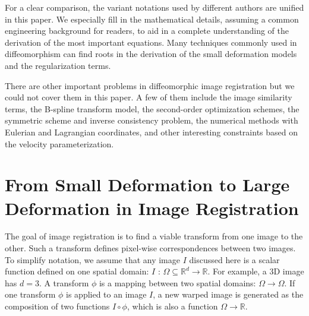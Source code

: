 \documentclass[letterpaper,12pt]{article}
\begin{document}
For a clear comparison, the variant notations used by different authors are unified in this paper. We especially fill in the mathematical details, assuming a
common engineering background for readers, to aid in a complete understanding of
the derivation of the most important equations. Many techniques commonly used in diffeomorphism can find roots in the derivation of the small deformation models and the regularization terms. 


There are other important problems in diffeomorphic image registration but we could not cover them in this paper. A few of them include the image  similarity terms, the B-spline transform model, the second-order optimization schemes, the symmetric scheme and inverse consistency problem, the numerical methods with Eulerian and Lagrangian coordinates, and other interesting constraints based on the velocity parameterization. 




\newcommand{\vect}[1]{\mathbf{#1}}
\newcommand{\field}[1]{\mathbf{#1}}
\newcommand{\image}[1]{#1}
\newcommand{\I}{\image{I}}
\newcommand{\J}{\image{J}}
\renewcommand{\u}{\vect{u}}
\renewcommand{\v}{\vect{v}}
\renewcommand{\c}{\vect{c}}
\newcommand{\h}{\vect{h}}
\newcommand{\w}{\vect{w}}
\newcommand{\myphi}{\phi}
\newcommand{\mypsi}{\psi}
\newcommand{\D}{D}
\renewcommand{\d}{\nabla}
\newcommand{\dd}{\text{d}}
\newcommand{\p}{\partial}
\renewcommand{\L}{\Delta} %
\newcommand{\R}{\mathbb{R}}
\newcommand{\myS}{S}
\newcommand{\myR}{R}
\newcommand{\myE}{E}
\newcommand{\ld}{\langle}
\newcommand{\rd}{\rangle}
\newcommand{\LL}{\mathcal{L}} %
\newcommand{\tQ}{\mathcal{Q}}
\newcommand{\Id}{\text{Id}}
\newcommand{\tG}{{G}} %
\newcommand{\Diff}{\text{Diff}}
\newcommand{\VV}{\mathcal{V}}
\newcommand{\opL}{\mathcal{L}}

\section{From Small Deformation to Large Deformation in Image Registration}

The goal of image registration is to find a viable transform from one image to the other. Such a transform defines pixel-wise correspondences between two images. 
To simplify notation, we assume that any image $\I$ discussed here is a scalar function defined on one spatial domain: $\I$ : $\Omega \subseteq \R^d \to \R$. 
For example, a 3D image has $d=3$. A transform $\myphi$ is a mapping between two spatial domains: $\Omega \rightarrow \Omega$. 
If one transform $\myphi$ is applied to an image $I$, a new warped
image is generated as the composition of two functions $\I \circ
\myphi$, which is also a function $\Omega \to \R$. 
\end{document}
